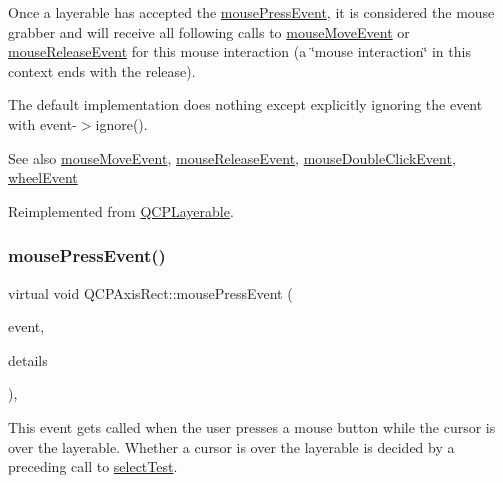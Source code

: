 Once a layerable has accepted the \hyperlink{class_q_c_p_axis_rect_aa9a7c807eaa4666870ac94aa6abc4dde}{mouse\+Press\+Event}, it is considered the mouse grabber and will receive all following calls to \hyperlink{class_q_c_p_axis_rect_a9cd27ad8c5cfb49aefd9dbb30def4beb}{mouse\+Move\+Event} or \hyperlink{class_q_c_p_axis_rect_a6c89b988d3a0b93c0878f0ebdb5037f4}{mouse\+Release\+Event} for this mouse interaction (a \char`\"{}mouse interaction\char`\"{} in this context ends with the release).

The default implementation does nothing except explicitly ignoring the event with {\ttfamily event-\/$>$ignore()}.

\begin{DoxySeeAlso}{See also}
\hyperlink{class_q_c_p_axis_rect_a9cd27ad8c5cfb49aefd9dbb30def4beb}{mouse\+Move\+Event}, \hyperlink{class_q_c_p_axis_rect_a6c89b988d3a0b93c0878f0ebdb5037f4}{mouse\+Release\+Event}, \hyperlink{class_q_c_p_layerable_a4171e2e823aca242dd0279f00ed2de81}{mouse\+Double\+Click\+Event}, \hyperlink{class_q_c_p_axis_rect_a93eeaa0c127d6d6fe8171b2455080262}{wheel\+Event} 
\end{DoxySeeAlso}


Reimplemented from \hyperlink{class_q_c_p_layerable_af6567604818db90f4fd52822f8bc8376}{Q\+C\+P\+Layerable}.

\mbox{\label{class_q_c_p_axis_rect_a8f514245839c0bfd9472e945899064e7}} 
\subsubsection{\texorpdfstring{mouse\+Press\+Event()}{mousePressEvent()}\hspace{0.1cm}{\footnotesize\ttfamily [2/2]}}
{\footnotesize\ttfamily virtual void Q\+C\+P\+Axis\+Rect\+::mouse\+Press\+Event (\begin{DoxyParamCaption}\item[{Q\+Mouse\+Event $\ast$}]{event,  }\item[{const Q\+Variant \&}]{details }\end{DoxyParamCaption})\hspace{0.3cm}{\ttfamily [protected]}, {\ttfamily [virtual]}}

This event gets called when the user presses a mouse button while the cursor is over the layerable. Whether a cursor is over the layerable is decided by a preceding call to \hyperlink{class_q_c_p_layout_element_ae97f483cccedadbf18ea4525ef240ee4}{select\+Test}.

